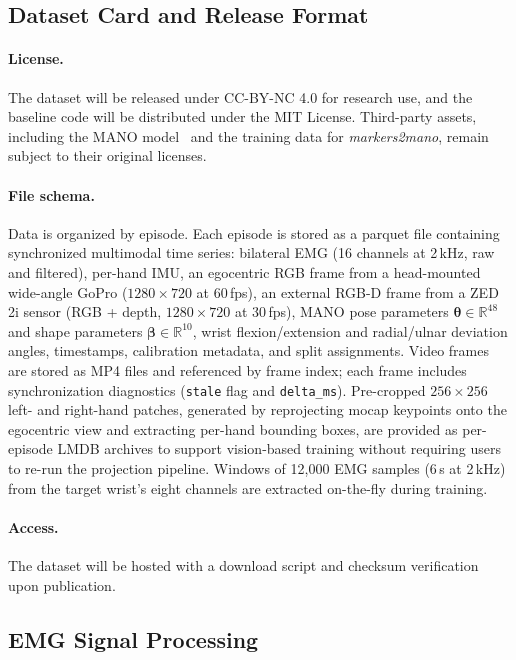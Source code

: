 \documentclass[letterpaper]{article} %
\newcommand{\marker}{\textit{markers2mano}}
\begin{document}
\twocolumn
\subsection{Dataset Card and Release Format}
\label{app:dataset_card}

\paragraph{License.}
The dataset will be released under CC-BY-NC 4.0 for research use, and the baseline code will be distributed under the MIT License. Third-party assets, including the MANO model~\citep{mano} and the training data for \marker{}, remain subject to their original licenses.

\paragraph{File schema.}
Data is organized by episode. Each episode is stored as a parquet file containing synchronized multimodal time series: bilateral EMG (16 channels at 2\,kHz, raw and filtered), per-hand IMU, an egocentric RGB frame from a head-mounted wide-angle GoPro ($1280 \times 720$ at 60\,fps), an external RGB-D frame from a ZED 2i sensor (RGB + depth, $1280 \times 720$ at 30\,fps), MANO pose parameters $\boldsymbol{\theta} \in \mathbb{R}^{48}$ and shape parameters $\boldsymbol{\beta} \in \mathbb{R}^{10}$, wrist flexion/extension and radial/ulnar deviation angles, timestamps, calibration metadata, and split assignments. Video frames are stored as MP4 files and referenced by frame index; each frame includes synchronization diagnostics (\texttt{stale} flag and \texttt{delta\_ms}). Pre-cropped $256\times256$ left- and right-hand patches, generated by reprojecting mocap keypoints onto the egocentric view and extracting per-hand bounding boxes, are provided as per-episode LMDB archives to support vision-based training without requiring users to re-run the projection pipeline. Windows of 12{,}000 EMG samples (6\,s at 2\,kHz) from the target wrist's eight channels are extracted on-the-fly during training.

\paragraph{Access.}
The dataset will be hosted with a download script and checksum verification upon publication.

\subsection{EMG Signal Processing}
\label{app:emg_processing}
\end{document}
